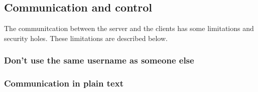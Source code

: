 \subsection{Communication and control}
The communitcation between the server and the clients has some limitations and security holes. These limitations are described below.

\subsubsection{Don't use the same username as someone else}

\subsubsection{Communication in plain text}

\subsubsection{}
